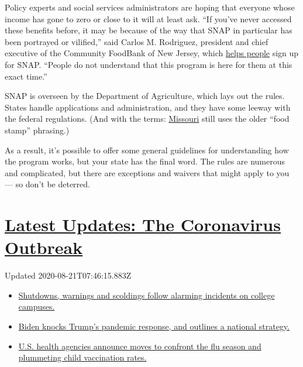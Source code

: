 Policy experts and social services administrators are hoping that
everyone whose income has gone to zero or close to it will at least ask.
``If you've never accessed these benefits before, it may be because of
the way that SNAP in particular has been portrayed or vilified,'' said
Carlos M. Rodriguez, president and chief executive of the Community
FoodBank of New Jersey, which \href{https://cfbnj.org/findfood/}{helps
people} sign up for SNAP. ``People do not understand that this program
is here for them at this exact time.''

SNAP is overseen by the Department of Agriculture, which lays out the
rules. States handle applications and administration, and they have some
leeway with the federal regulations. (And with the terms:
\href{https://mydss.mo.gov/food-assistance/food-stamp-program}{Missouri}
still uses the older ``food stamp'' phrasing.)

As a result, it's possible to offer some general guidelines for
understanding how the program works, but your state has the final word.
The rules are numerous and complicated, but there are exceptions and
waivers that might apply to you --- so don't be deterred.

\hypertarget{latest-updates-the-coronavirus-outbreak}{%
\section{\texorpdfstring{\href{https://www.nytimes3xbfgragh.onion/2020/08/20/world/coronavirus-covid.html?action=click\&pgtype=Article\&state=default\&region=MAIN_CONTENT_1\&context=storylines_live_updates}{Latest
Updates: The Coronavirus
Outbreak}}{Latest Updates: The Coronavirus Outbreak}}\label{latest-updates-the-coronavirus-outbreak}}

Updated 2020-08-21T07:46:15.883Z

\begin{itemize}
\tightlist
\item
  \href{https://www.nytimes3xbfgragh.onion/2020/08/20/world/coronavirus-covid.html?action=click\&pgtype=Article\&state=default\&region=MAIN_CONTENT_1\&context=storylines_live_updates\#link-68774d88}{Shutdowns,
  warnings and scoldings follow alarming incidents on college campuses.}
\item
  \href{https://www.nytimes3xbfgragh.onion/2020/08/20/world/coronavirus-covid.html?action=click\&pgtype=Article\&state=default\&region=MAIN_CONTENT_1\&context=storylines_live_updates\#link-26b58724}{Biden
  knocks Trump's pandemic response, and outlines a national strategy.}
\item
  \href{https://www.nytimes3xbfgragh.onion/2020/08/20/world/coronavirus-covid.html?action=click\&pgtype=Article\&state=default\&region=MAIN_CONTENT_1\&context=storylines_live_updates\#link-4e542da3}{U.S.
  health agencies announce moves to confront the flu season and
  plummeting child vaccination rates.}
\end{itemize}


